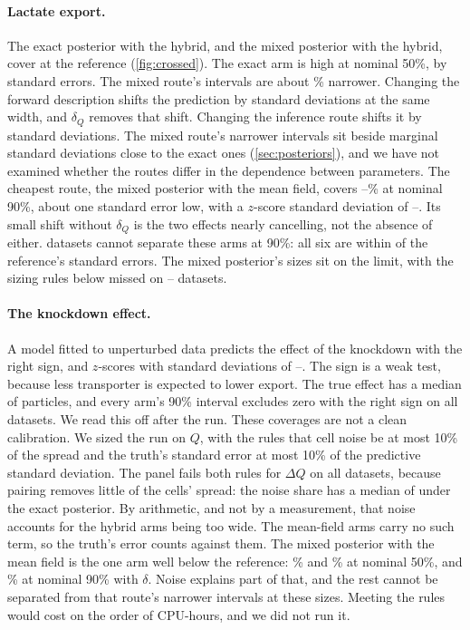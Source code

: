 \paragraph{Lactate export.} The exact posterior with the hybrid, and the mixed posterior
with the hybrid, cover at the reference (\cref{fig:crossed}). The exact arm
is high at nominal 50\%, by  standard errors. The mixed route's
intervals are about \% narrower. Changing the forward description
shifts the prediction by  standard deviations at the same width, and $\delta_Q$ removes that shift. Changing the inference route shifts it by  standard deviations. The mixed route's narrower intervals sit beside marginal standard deviations close to the exact ones (\cref{sec:posteriors}), and we have not examined whether the routes differ in the dependence between parameters. The cheapest route, the mixed posterior with the mean field, covers
--\% at nominal 90\%, about one standard error low, with a $z$-score standard deviation of --. Its small shift without $\delta_Q$ is the two effects nearly cancelling, not the absence of
either.  datasets cannot separate these arms at 90\%: all six are within  of the reference's standard errors. The mixed posterior's sizes sit on the limit, with the sizing rules below missed on -- datasets.

\paragraph{The knockdown effect.} A model fitted to unperturbed data predicts the effect of the knockdown with the right sign, and $z$-scores with standard deviations of --. The sign is a weak test, because less transporter is expected to lower export. The true effect has a median of
 particles, and every arm's 90\% interval excludes zero with the right
sign on all  datasets. We read this off after the run. These coverages are
not a clean calibration. We sized the run on $Q$, with the rules that cell noise be at
most 10\% of the spread and the truth's standard error at most 10\% of the predictive
standard deviation. The panel fails both rules for $\Delta Q$ on all 
datasets, because pairing removes little of the cells' spread: the noise share has a
median of  under the exact posterior. By arithmetic, and not by a measurement, that noise accounts for the hybrid arms being too wide. The mean-field arms carry no such term,
so the truth's error counts against them. The mixed posterior with the mean field is the one arm well below the reference: \% and \% at nominal 50\%, and
\% at nominal 90\% with $\delta$. Noise explains part of that, and the
rest cannot be separated from that route's narrower intervals at these sizes. Meeting the
rules would cost on the order of  CPU-hours, and we did not run it.

